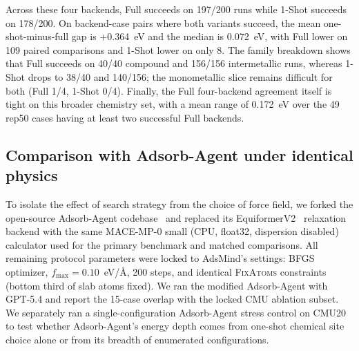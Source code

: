 Across these four backends, Full succeeds on 197/200 runs while 1-Shot succeeds on 178/200.
On backend-case pairs where both variants succeed, the mean one-shot-minus-full gap is +0.364~eV and the median is 0.072~eV, with Full lower on 109 paired comparisons and 1-Shot lower on only 8.
The family breakdown shows that Full succeeds on 40/40 compound and 156/156 intermetallic runs, whereas 1-Shot drops to 38/40 and 140/156; the monometallic slice remains difficult for both (Full 1/4, 1-Shot 0/4).
Finally, the Full four-backend agreement itself is tight on this broader chemistry set, with a mean range of 0.172~eV over the 49 rep50 cases having at least two successful Full backends.

\subsection{Comparison with Adsorb-Agent under identical physics}

To isolate the effect of search strategy from the choice of force field, we forked the open-source Adsorb-Agent codebase~\cite{adsorbagent} and replaced its EquiformerV2~\cite{liao2023equiformerv2} relaxation backend with the same MACE-MP-0 small (CPU, float32, dispersion disabled) calculator used for the primary benchmark and matched comparisons.
All remaining protocol parameters were locked to AdsMind's settings: BFGS optimizer, $f_\mathrm{max} = 0.10$~eV/\AA, 200 steps, and identical \textsc{FixAtoms} constraints (bottom third of slab atoms fixed).
We ran the modified Adsorb-Agent with GPT-5.4 and report the 15-case overlap with the locked CMU ablation subset.
We separately ran a single-configuration Adsorb-Agent stress control on CMU20 to test whether Adsorb-Agent's energy depth comes from one-shot chemical site choice alone or from its breadth of enumerated configurations.

